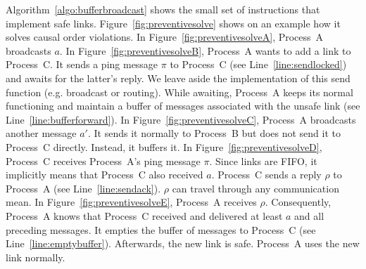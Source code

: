 Algorithm~\ref{algo:bufferbroadcast} shows the small set of instructions that
implement safe links.  Figure~\ref{fig:preventivesolve} shows on an example how
it solves causal order violations. In Figure~\ref{fig:preventivesolveA},
Process~A broadcasts $a$.  In Figure~\ref{fig:preventivesolveB}, Process~A wants
to add a link to Process~C. It sends a ping message $\pi$ to Process~C (see
Line~\ref{line:sendlocked}) and awaits for the latter's reply.  We leave aside
the implementation of this send function (e.g. broadcast or routing).  While
awaiting, Process~A keeps its normal functioning and maintain a buffer of
messages associated with the unsafe link (see Line~\ref{line:bufferforward}). In
Figure~\ref{fig:preventivesolveC}, Process~A broadcasts another message $a'$. It
sends it normally to Process~B but does not send it to Process~C
directly. Instead, it buffers it. In Figure~\ref{fig:preventivesolveD},
Process~C receives Process~A's ping message $\pi$. Since links are FIFO, it
implicitly means that Process~C also received $a$. Process~C sends a reply
$\rho$ to Process~A (see Line~\ref{line:sendack}). $\rho$ can travel through any
communication mean. In Figure~\ref{fig:preventivesolveE}, Process~A receives
$\rho$. Consequently, Process~A knows that Process~C received and delivered at
least $a$ and all preceding messages. It empties the buffer of messages to
Process~C (see Line~\ref{line:emptybuffer}). Afterwards, the new link is
safe. Process~A uses the new link normally.



